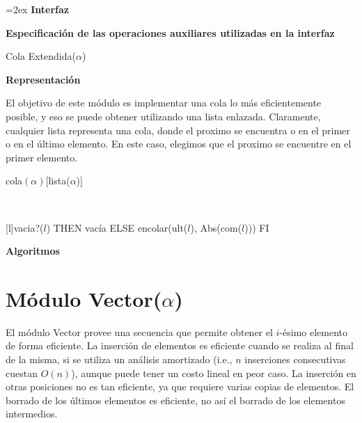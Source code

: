 \documentclass[a4paper,10pt]{article}
\newenvironment{Interfaz}{%
  \parskip=2ex%
  \noindent\textbf{\Large Interfaz}%
  \par%
}{}
\newenvironment{Representacion}{%
  \vspace*{2ex}%
  \noindent\textbf{\Large Representación}%
  \vspace*{2ex}%
}{}
\newenvironment{Algoritmos}{%
  \vspace*{2ex}%
  \noindent\textbf{\Large Algoritmos}%
  \vspace*{2ex}%
}{}
\newcommand{\Titulo}[1]{
  \vspace*{1ex}\par\noindent\textbf{\large #1}\par
}
\begin{document}
\begin{Interfaz}
  \Titulo{Especificación de las operaciones auxiliares utilizadas en la interfaz}

  \begin{tad}{Cola Extendida($\alpha$)}
    \parskip=0pt
    
    \tadAxiomas
  \end{tad}

\end{Interfaz}

\begin{Representacion}
  
  El objetivo de este módulo es implementar una cola lo más eficientemente posible, y eso se puede obtener utilizando una lista enlazada.  Claramente, cualquier lista representa una cola, donde el proximo se encuentra o en el primer o en el último elemento.  En este caso, elegimos que el proximo se encuentre en el primer elemento.

  \begin{Estructura}{cola$(\alpha)$}[lista($\alpha$)]
  \end{Estructura}


  ~

  [l]{\IF vacia?($l$) THEN vacía ELSE encolar(ult($l$), Abs(com($l$))) FI}

\end{Representacion}

\begin{Algoritmos}
  
\end{Algoritmos}


\section{Módulo Vector($\alpha$)}

El módulo Vector provee una secuencia que permite obtener el $i$-ésimo elemento de forma eficiente.  La inserción de elementos es eficiente cuando se realiza al final de la misma, si se utiliza un análisis amortizado (i.e., $n$ inserciones consecutivas cuestan $O(n)$), aunque puede tener un costo lineal en peor caso.  La inserción en otras posiciones no es tan eficiente, ya que requiere varias copias de elementos.  El borrado de los últimos elementos es eficiente, no así el borrado de los elementos intermedios.  
\end{document}
